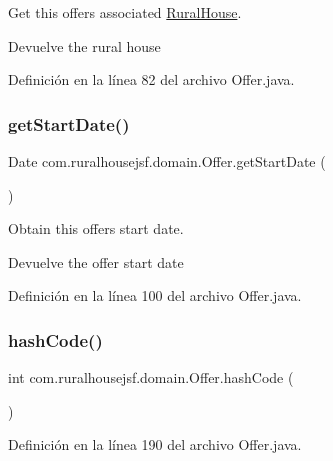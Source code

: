 Get this offers associated \mbox{\hyperlink{classcom_1_1ruralhousejsf_1_1domain_1_1_rural_house}{Rural\+House}}.

\begin{DoxyReturn}{Devuelve}
the rural house 
\end{DoxyReturn}


Definición en la línea 82 del archivo Offer.\+java.

\mbox{\label{classcom_1_1ruralhousejsf_1_1domain_1_1_offer_a41039d86fd455568f6623996b639b7a5}} 
\subsubsection{\texorpdfstring{getStartDate()}{getStartDate()}}
{\footnotesize\ttfamily Date com.\+ruralhousejsf.\+domain.\+Offer.\+get\+Start\+Date (\begin{DoxyParamCaption}{ }\end{DoxyParamCaption})}

Obtain this offers start date.

\begin{DoxyReturn}{Devuelve}
the offer start date 
\end{DoxyReturn}


Definición en la línea 100 del archivo Offer.\+java.

\mbox{\label{classcom_1_1ruralhousejsf_1_1domain_1_1_offer_aad4fd5441e084e41b30bb1d8d3597c48}} 
\subsubsection{\texorpdfstring{hashCode()}{hashCode()}}
{\footnotesize\ttfamily int com.\+ruralhousejsf.\+domain.\+Offer.\+hash\+Code (\begin{DoxyParamCaption}{ }\end{DoxyParamCaption})}



Definición en la línea 190 del archivo Offer.\+java.

